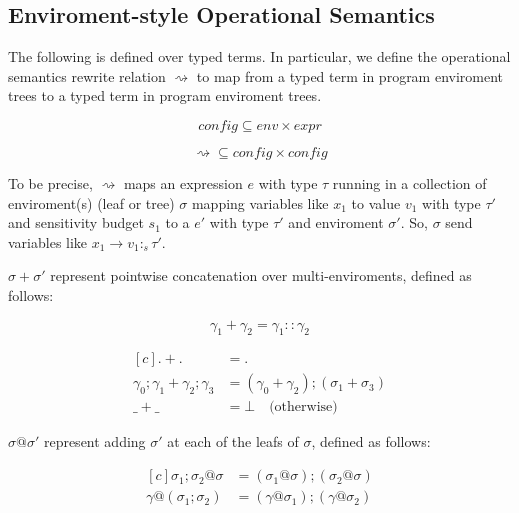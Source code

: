 \subsection{Enviroment-style Operational Semantics}
The following is defined over typed terms. In particular, we define the
operational semantics rewrite relation $\rightsquigarrow$ to map from a typed
term in program enviroment trees to a typed term in program enviroment trees. 

$$
\textit{config} \subseteq \textit{env} \times \textit{expr}
$$

$$
\rightsquigarrow \subseteq \textit{config} \times \textit{config}
$$

To be precise, $\rightsquigarrow$ maps an expression $e$ with type $\tau$
running in a collection of enviroment(s) (leaf or tree) $\sigma$ mapping
variables like $x_1$ to value $v_1$ with type $\tau'$ and sensitivity budget
$s_1$ to a $e'$ with type $\tau'$ and enviroment $\sigma'$. So, $\sigma$ send
variables like $x_1 \to v_1 :_s \tau'$.

$\sigma + \sigma'$ represent pointwise concatenation over multi-enviroments,
defined as follows:

\begin{definition}
  \begin{equation}
    \gamma_1 + \gamma_2 = \gamma_1 :: \gamma_2 
  \end{equation}
\end{definition}

\begin{definition}
  \begin{equation}
    \begin{aligned}[c]
      . + . &=  . \\ 
      \gamma_0;\gamma_1 + \gamma_2;\gamma_3 &= (\gamma_0 + \gamma_2);(\sigma_1 + \sigma_3) \\ 
      \_ + \_ &= \bot \quad{\text{(otherwise)}}
    \end{aligned}
  \end{equation}
\end{definition}

$\sigma @ \sigma'$ represent adding $\sigma'$ at each of the leafs of $\sigma$,
defined as follows:
\begin{definition}
  \begin{equation}
    \begin{aligned}[c]
      \sigma_1; \sigma_2 @ \sigma &= (\sigma_1 @ \sigma);(\sigma_2 @ \sigma) \\
      \gamma @ (\sigma_1; \sigma_2) &= (\gamma @ \sigma_1);(\gamma @ \sigma_2)
    \end{aligned}
  \end{equation}
\end{definition}

